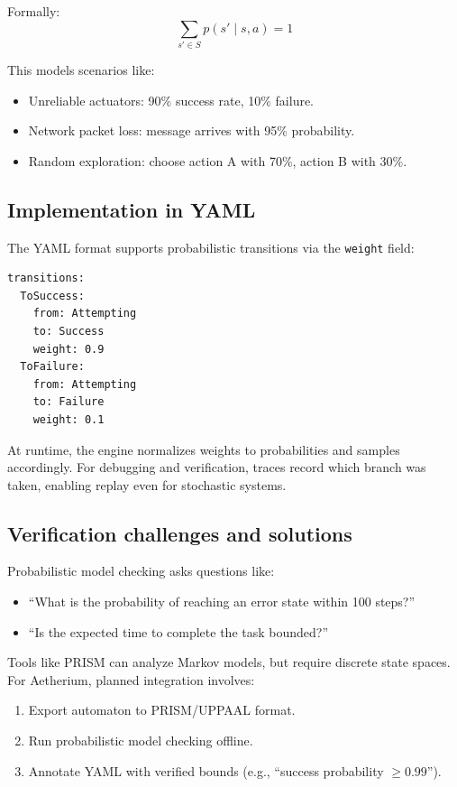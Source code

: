 Formally:
\[
\sum_{s' \in S} p(s' \mid s, a) = 1
\]

This models scenarios like:
\begin{itemize}
  \item Unreliable actuators: 90\% success rate, 10\% failure.
  \item Network packet loss: message arrives with 95\% probability.
  \item Random exploration: choose action A with 70\%, action B with 30\%.
\end{itemize}

\subsection{Implementation in YAML}

The YAML format supports probabilistic transitions via the \texttt{weight} field:
\begin{verbatim}
transitions:
  ToSuccess:
    from: Attempting
    to: Success
    weight: 0.9
  ToFailure:
    from: Attempting
    to: Failure
    weight: 0.1
\end{verbatim}

At runtime, the engine normalizes weights to probabilities and samples accordingly.
For debugging and verification, traces record which branch was taken, enabling replay even for stochastic systems.

\subsection{Verification challenges and solutions}

Probabilistic model checking asks questions like:
\begin{itemize}
  \item ``What is the probability of reaching an error state within 100 steps?''
  \item ``Is the expected time to complete the task bounded?''
\end{itemize}

Tools like PRISM can analyze Markov models, but require discrete state spaces.
For Aetherium, planned integration involves:
\begin{enumerate}
  \item Export automaton to PRISM/UPPAAL format.
  \item Run probabilistic model checking offline.
  \item Annotate YAML with verified bounds (e.g., ``success probability $\geq 0.99$'').
\end{enumerate}

